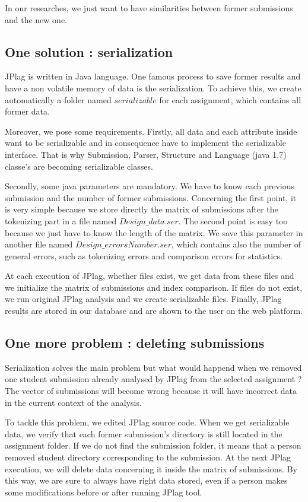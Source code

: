 \documentclass[twoside]{article}
\begin{document}
\begin{multicols*}{2}
In our researches, we just want to have similarities between former submissions and the new one.

\newpage
\subsection{One solution : serialization}

JPlag is written in Java language. One famous process to save former results and have a non volatile memory of data is the serialization. To achieve this, we create automatically a folder named $ serializable $ for each assignment, which contains all former data. 

Moreover, we pose some requirements. Firstly, all data and each attribute inside want to be serializable and in consequence have to implement the serializable interface. That is why Submission, Parser, Structure and Language (java 1.7) classe's are becoming serializable classes. 

Secondly, some java parameters are mandatory. We have to know each previous submission and the number of former submissions. Concerning the first point, it is very simple because we store directly the matrix of submissions after the tokenizing part in a file named $ Design\_data.ser $. The second point is easy too because we just have to know the length of the matrix. We save this parameter in another file named $ Design\_errorsNumber.ser $, which contains also the number of general errors, such as tokenizing errors and comparison errors for statistics. 

At each execution of JPlag, whether files exist, we get data from these files and we initialize the matrix of submissions and index comparison. If files do not exist, we run original JPlag analysis and we create serializable files. Finally, JPlag results are stored in our database and are shown to the user on the web platform. 
\vfill

\subsection{One more problem : deleting submissions}

Serialization solves the main problem but what would happend when we removed one student submission already analysed by JPlag from the selected assignment ? The vector of submissions will become wrong because it will have incorrect data in the current context of the analysis. 

To tackle this problem, we edited JPlag source code. When we get serializable data, we verify that each former submission's directory is still located in the assignment folder. If we do not find the submission folder, it means that a person removed student directory corresponding to the submission. At the next JPlag execution, we will delete data concerning it inside the matrix of submissions. By this way, we are sure to always have right data stored, even if a person makes some modifications before or after running JPlag tool.


\end{multicols*}
\end{document}
